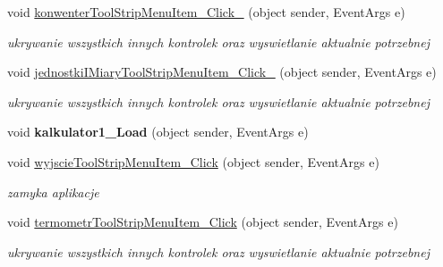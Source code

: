 \begin{DoxyCompactItemize}
void \mbox{\hyperlink{classkalku__all__in__one_1_1_form1_a05c362c039f2c6613539dd2dbc84fce0}{konwenter\+Tool\+Strip\+Menu\+Item\+\_\+\+Click\+\_}} (object sender, Event\+Args e)
\begin{DoxyCompactList}\small\item\em ukrywanie wszystkich innych kontrolek oraz wyswietlanie aktualnie potrzebnej \end{DoxyCompactList}\item 
\mbox{\label{classkalku__all__in__one_1_1_form1_ae05555c64510477c8eeab3ad470115dd}} 
void \mbox{\hyperlink{classkalku__all__in__one_1_1_form1_ae05555c64510477c8eeab3ad470115dd}{jednostki\+I\+Miary\+Tool\+Strip\+Menu\+Item\+\_\+\+Click\+\_}} (object sender, Event\+Args e)
\begin{DoxyCompactList}\small\item\em ukrywanie wszystkich innych kontrolek oraz wyswietlanie aktualnie potrzebnej \end{DoxyCompactList}\item 
\mbox{\label{classkalku__all__in__one_1_1_form1_a934204460b0f20725102161f025803a9}} 
void {\bfseries kalkulator1\+\_\+\+Load} (object sender, Event\+Args e)
\item 
void \mbox{\hyperlink{classkalku__all__in__one_1_1_form1_a86268b4e30d5a242cbe53da566b7feb4}{wyjscie\+Tool\+Strip\+Menu\+Item\+\_\+\+Click}} (object sender, Event\+Args e)
\begin{DoxyCompactList}\small\item\em zamyka aplikacje \end{DoxyCompactList}\item 
\mbox{\label{classkalku__all__in__one_1_1_form1_aca0a347fa07bc3e5517c73c2cdb3d24c}} 
void \mbox{\hyperlink{classkalku__all__in__one_1_1_form1_aca0a347fa07bc3e5517c73c2cdb3d24c}{termometr\+Tool\+Strip\+Menu\+Item\+\_\+\+Click}} (object sender, Event\+Args e)
\begin{DoxyCompactList}\small\item\em ukrywanie wszystkich innych kontrolek oraz wyswietlanie aktualnie potrzebnej \end{DoxyCompactList}\item 
\mbox{\label{classkalku__all__in__one_1_1_form1_a15b1f2515415730a606a5a66dfe1ff00}} 

\end{DoxyCompactItemize}
